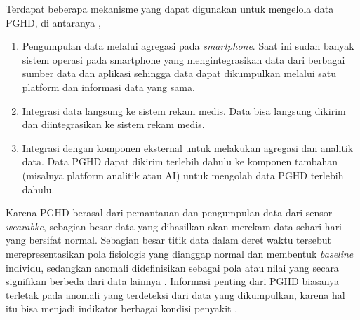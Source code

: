 Terdapat beberapa mekanisme yang dapat digunakan untuk mengelola data PGHD, di antaranya \parencite{Khatiwada_Yang_Lin_Blobel_2024_PGHD_Understanding},

\begin{enumerate}
    \item Pengumpulan data melalui agregasi pada \textit{smartphone}.
    Saat ini sudah banyak sistem operasi pada smartphone yang mengintegrasikan data dari berbagai sumber data dan aplikasi sehingga data dapat dikumpulkan melalui satu platform dan informasi data yang sama.
    \item Integrasi data langsung ke sistem rekam medis.
    Data bisa langsung dikirim dan diintegrasikan ke sistem rekam medis.
    \item Integrasi dengan komponen eksternal untuk melakukan agregasi dan analitik data.
    Data PGHD dapat dikirim terlebih dahulu ke komponen tambahan (misalnya platform analitik atau AI) untuk mengolah data PGHD terlebih dahulu.
\end{enumerate}

Karena PGHD berasal dari pemantauan dan pengumpulan data dari sensor \textit{wearabke}, sebagian besar data yang dihasilkan akan merekam data sehari-hari yang bersifat normal. 
Sebagian besar titik data dalam deret waktu tersebut merepresentasikan pola fisiologis yang dianggap normal dan membentuk \textit{baseline} individu, sedangkan anomali didefinisikan sebagai pola atau nilai yang secara signifikan berbeda dari data lainnya \parencite{sunny2022anomaly}. 
Informasi penting dari PGHD biasanya terletak pada anomali yang terdeteksi dari data yang dikumpulkan, karena hal itu bisa menjadi indikator berbagai kondisi penyakit \parencite{sunny2022anomaly,shenvi2023visualization}.

